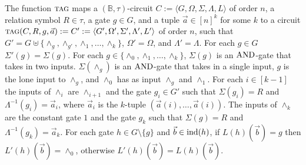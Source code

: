 \documentclass[../paper.tex]{subfiles}
\begin{document}
\begin{definition}
  The function ${\normalfont\textsc{tag}}$ maps a $(\mathbb{B}, \tau)$-circuit $C := \langle G,
  \Omega, \Sigma, \Lambda, L \rangle$ of order $n$, a relation symbol $R \in
  \tau$, a gate $g \in G$, and a tuple $\vec{a} \in [n]^k$ for some $k$ to a
  circuit ${\normalfont\textsc{tag}}(C, R, g, \vec{a}) := C' := \langle G', \Omega', \Sigma',
  \Lambda', L'\rangle$ of order $n$, such that $G' = G \uplus \{\land_g,
  \land_{g'}, \land_1, \ldots , \land_k\}$, $\Omega' = \Omega$, and $\Lambda' =
  \Lambda$. For each $g \in G$ $\Sigma'(g) = \Sigma(g)$. For each $g \in
  \{\land_0, \land_1, \ldots , \land_k \}$, $\Sigma(g)$ is an $\text{\upshape AND}$-gate that
  takes in two inputs. $\Sigma(\land_g)$ is an $\text{\upshape AND}$-gate that takes in a
  single input, $g$ is the lone input to $\land_g$, and $\land_0$ has as input
  $\land_g$ and $\land_1$. For each $i \in [k-1]$ the inputs of $\land_i$ are
  $\land_{i+1}$ and the gate $g_i \in G'$ such that $\Sigma(g_i) = R$ and
  $\Lambda^{-1}(g_i) = \vec{a}_i$, where $\vec{a}_i$ is the $k$-tuple
  $(\vec{a}(i), \ldots, \vec{a}(i))$. The inputs of $\land_k$ are the constant
  gate $1$ and the gate $g_k$ such that $\Sigma(g) = R$ and $\Lambda^{-1}(g_k) =
  \vec{a}_k$. For each gate $h \in G \setminus \{g\}$ and $\vec{b} \in \text{\upshape ind}(h)$,
  if $L(h)(\vec{b}) = g$ then $L'(h)(\vec{b}) = \land_0$, otherwise
  $L'(h)(\vec{b}) = L(h)(\vec{b})$.
\end{definition}

\end{document}
